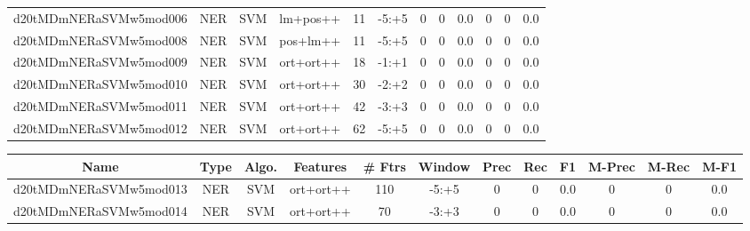 \documentclass[a4paper]{article}
\begin{document}
\begin{landscape}
\begin{center}
\begin{tabular}{ |c|c|c|c|c|c|c|c|c|c|c|c|}
 
 	
 	\small{ d20tMDmNERaSVMw5mod006 } & \small{ NER} & \small{  SVM }  & lm+pos++  &  11 &  \small{  -5:+5 }  &  0 & 0 & 0.0  &  0 & 0 & 0.0 \\
 	

 
 	
 	\small{ d20tMDmNERaSVMw5mod008 } & \small{ NER} & \small{  SVM }  & pos+lm++  &  11 &  \small{  -5:+5 }  &  0 & 0 & 0.0  &  0 & 0 & 0.0 \\
 	

 
 	
 	\small{ d20tMDmNERaSVMw5mod009 } & \small{ NER} & \small{  SVM }  & ort+ort++  &  18 &  \small{  -1:+1 }  &  0 & 0 & 0.0  &  0 & 0 & 0.0 \\
 	

 
 	
 	\small{ d20tMDmNERaSVMw5mod010 } & \small{ NER} & \small{  SVM }  & ort+ort++  &  30 &  \small{  -2:+2 }  &  0 & 0 & 0.0  &  0 & 0 & 0.0 \\
 	

 
 	
 	\small{ d20tMDmNERaSVMw5mod011 } & \small{ NER} & \small{  SVM }  & ort+ort++  &  42 &  \small{  -3:+3 }  &  0 & 0 & 0.0  &  0 & 0 & 0.0 \\
 	

 
 	
 	\small{ d20tMDmNERaSVMw5mod012 } & \small{ NER} & \small{  SVM }  & ort+ort++  &  62 &  \small{  -5:+5 }  &  0 & 0 & 0.0  &  0 & 0 & 0.0 \\
 	
 \hline
\end{tabular}
\end{center}




\begin{center}
\begin{tabular}{ |c|c|c|c|c|c|c|c|c|c|c|c|} 
 \hline
 	Name & Type & Algo. & Features & \# Ftrs & Window & Prec & Rec & F1 & M-Prec & M-Rec & M-F1\\
 \hline

 	

 
 	
 	\small{ d20tMDmNERaSVMw5mod013 } & \small{ NER} & \small{  SVM }  & ort+ort++  &  110 &  \small{  -5:+5 }  &  0 & 0 & 0.0  &  0 & 0 & 0.0 \\
 	

 
 	
 	\small{ d20tMDmNERaSVMw5mod014 } & \small{ NER} & \small{  SVM }  & ort+ort++  &  70 &  \small{  -3:+3 }  &  0 & 0 & 0.0  &  0 & 0 & 0.0 \\
 	


\end{tabular}
\end{center}
\end{landscape}
\end{document}
